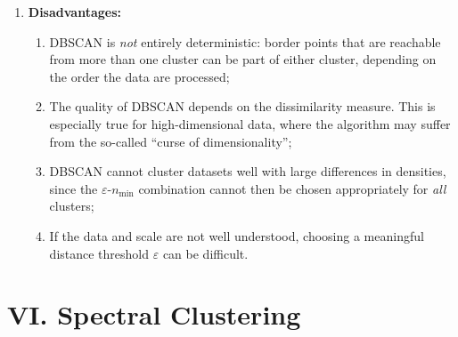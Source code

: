 \documentclass[12pt]{article}
\begin{document}
\begin{enumerate}[label=\textbf{\arabic*.}]
	\item \textbf{Disadvantages:}
	\begin{enumerate}
		\item DBSCAN is \emph{not} entirely deterministic: border points that are reachable from more than one cluster can be part of either cluster, depending on the order the data are processed; 
		\item The quality of DBSCAN depends on the dissimilarity measure. This is especially true for high-dimensional data, where the algorithm may suffer from the so-called ``curse of dimensionality''; 
		\item DBSCAN cannot cluster datasets well with large differences in densities, since the $\varepsilon$-$n_{\min}$ combination cannot then be chosen appropriately for \emph{all} clusters; 
		\item If the data and scale are not well understood, choosing a meaningful distance threshold $\varepsilon$ can be difficult. 
	\end{enumerate}
	
\end{enumerate}


\section*{VI. Spectral Clustering}
\end{document}

